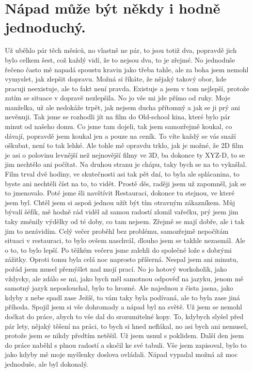 \section{Nápad může být někdy i hodně jednoduchý.}

Už uběhlo pár těch měsíců, no vlastně ne pár, to jsou totiž dva, popravdě jich bylo celkem šest, což každý vidí, že to nejsou dva, to je zřejmé. No jednoduše řečeno často mě napadá spoustu kravin jako třeba tahle, ale za boha jsem nemohl vymyslet, jak zlepšit dopravu. Možná si říkáte, že nějaký takový obor, kde pracuji neexistuje, ale to fakt není pravda. Existuje a jsem v tom nejlepší, protože zatím se situace v dopravě nezlepšila. No jo vše mi jde přímo od ruky. Moje manželka, už ale nedokáže trpět, jak nejsem ducha přítomný a jak se ji prý ani nevěnuji. Tak jsme se rozhodli jít na film do Old-school kina, které bylo pár minut od našeho domu. Co jsme tam dojeli, tak jsem samozřejmě koukal, co dávají, popravdě jsem koukal jen a pouze na ceník. To víte každý se vás snaží oškubat, není to tak lehké. Ale tohle mě opravdu trklo, jak je možné, že 2D film je asi o polovinu levnější než nejnovější filmy ve 3D, ba dokonce ty XYZ-D, to se jim nechtělo ani počítat. Na druhou stranu je chápu, taky bych se na to vykašlal. Film trval dvě hodiny, ve skutečnosti asi tak pět dní, to byla ale splácanina, to byste ani nechtěli číst na to, to vidět. Prostě děs, raději jsem už zapomněl, jak se to jmenovalo. Poté jsme šli navštívit Restauraci, dokonce tu stejnou, ve které jsem byl. Chtěl jsem si aspoň jednou užít být tím otravným zákazníkem. Můj bývalí šéfík, mě hodně rád viděl až samou radostí zlomil vařečku, prý jsem jim taky změnily výdělky od té doby, co tam nejsem. Zřejmě se mají dobře, ale i tak jim to nezávidím. Celý večer proběhl bez problému, samozřejmě nepočítám situaci v restauraci, to bylo ovšem naschvál, dlouho jsem se takhle nezasmál. Ale o to, to bylo lepší. Po těžkém večeru jsme zalehli do společné lože s dobrými zážitky. Oproti tomu byla celá noc naprosto příšerná. Nespal jsem ani minutu, pořád jsem musel přemýšlet nad mojí prací. No jo hotový workoholik, jako vždycky, ale zdálo se mi, jako bych měl samotnou odpověď na jazyku, jenom mě samotný jazyk neposlouchal, bylo to hrozné. Ale najednou z čista jasna, jako kdyby z nebe spadl zase Ježíš, to vám taky byla podívaná, ale to byla zase jiná příhoda. Spojil jsem si vše dohromady a nápad byl na světě. Už jsem se nemohl dočkat do práce, abych to vše dal do srozumitelné kopy. To, kdybych slyšel před pár lety, nějaký těšení na práci, to bych si hned neflákal, no asi bych ani nemusel, protože jsem se nikdy předtím netěšil. Už jsem usnul s poklidem. Další den jsem do práce naběhl s plnou radostí a skočil ke své tabuli. Vše jsem zapisoval, bylo to jako kdyby mě moje myšlenky doslova ovládali. Nápad vypadal možná až moc jednoduše, ale byl
dokonalý.

